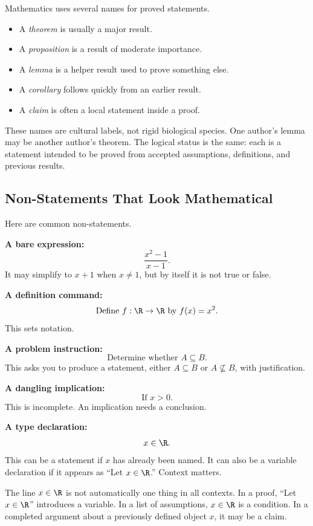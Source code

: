 Mathematics uses several names for proved statements.

\begin{itemize}
\item A \emph{theorem} is usually a major result.
\item A \emph{proposition} is a result of moderate importance.
\item A \emph{lemma} is a helper result used to prove something else.
\item A \emph{corollary} follows quickly from an earlier result.
\item A \emph{claim} is often a local statement inside a proof.
\end{itemize}

These names are cultural labels, not rigid biological species. One author's lemma may be another author's theorem. The logical status is the same: each is a statement intended to be proved from accepted assumptions, definitions, and previous results.

\subsection{Non-Statements That Look Mathematical}

Here are common non-statements.

\textbf{A bare expression:}
\[
\frac{x^2-1}{x-1}.
\]
It may simplify to $x+1$ when $x\neq1$, but by itself it is not true or false.

\textbf{A definition command:}
\[
\text{Define }f:\R\to\R\text{ by }f(x)=x^2.
\]
This sets notation.

\textbf{A problem instruction:}
\[
\text{Determine whether }A\subseteq B.
\]
This asks you to produce a statement, either $A\subseteq B$ or $A\not\subseteq B$, with justification.

\textbf{A dangling implication:}
\[
\text{If }x>0.
\]
This is incomplete. An implication needs a conclusion.

\textbf{A type declaration:}
\[
x\in\R.
\]
This can be a statement if $x$ has already been named. It can also be a variable declaration if it appears as ``Let $x\in\R$.'' Context matters.

\begin{trapbox}
The line $x\in\R$ is not automatically one thing in all contexts. In a proof, ``Let $x\in\R$'' introduces a variable. In a list of assumptions, $x\in\R$ is a condition. In a completed argument about a previously defined object $x$, it may be a claim.
\end{trapbox}


